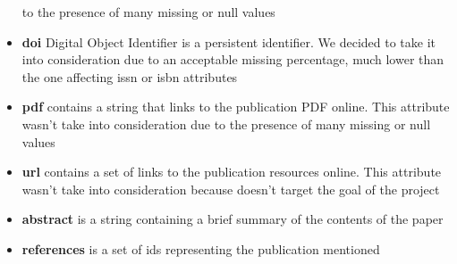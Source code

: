 \documentclass{Configuration_Files/PoliMi3i_thesis}
\begin{document}
\begin{itemize}
            to the presence of many missing or null values
    \item \textbf{doi} Digital Object Identifier is a persistent identifier. We decided to take it into consideration
            due to an acceptable missing percentage, much lower than the one affecting issn or isbn attributes
    \item \textbf{pdf} contains a string that links to the publication PDF online. This attribute wasn't take into
            consideration due to the presence of many missing or null values
    \item \textbf{url} contains a set of links to the publication resources online. This attribute wasn't take into
            consideration because doesn't target the goal of the project
    \item \textbf{abstract} is a string containing a brief summary of the contents of the paper
    \item \textbf{references} is a set of ids representing the publication mentioned
\end{itemize}
\bigskip
\end{document}
